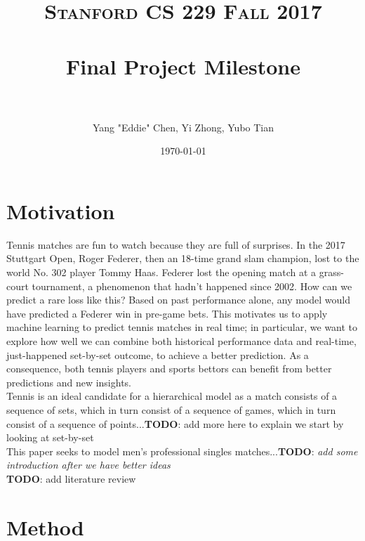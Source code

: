 \documentclass[paper=a4, fontsize=11pt]{scrartcl} %
\title{	
\normalfont \normalsize 
\textsc{Stanford CS 229 Fall 2017} \\ [25pt] %
\horrule{0.5pt} \\[0.4cm] %
\huge Final Project Milestone\\ %
\horrule{2pt} \\[0.5cm] %
}
\author{Yang "Eddie" Chen, Yi Zhong, Yubo Tian} %
\date{\normalsize\today} %
\numberwithin{equation}{section} %
\numberwithin{figure}{section} %
\numberwithin{table}{section} %
\begin{document}
\maketitle %


\section{Motivation}
Tennis matches are fun to watch because they are full of surprises. In the 2017 Stuttgart Open, Roger Federer, then an 18-time grand slam champion, lost to the world No. 302 player Tommy Haas. Federer lost the opening match at a grass-court tournament, a phenomenon that hadn't happened since 2002. How can we predict a rare loss like this? Based on past performance alone, any model would have predicted a Federer win in pre-game bets. This motivates us to apply machine learning to predict tennis matches in real time; in particular, we want to explore how well we can combine both historical performance data and real-time, just-happened set-by-set outcome, to achieve a better prediction. As a consequence, both tennis players and sports bettors can benefit from better predictions and new insights. \\

Tennis is an ideal candidate for a hierarchical model as a match consists of a sequence of sets, which in turn consist of a sequence of games, which in turn consist of a sequence of points...\textbf{TODO}: add more here to explain we start by looking at set-by-set\\

This paper seeks to model men's professional singles matches...\textbf{TODO}: \textit{add some introduction after we have better ideas} \\

\textbf{TODO}: add literature review

\section{Method}
\end{document}
